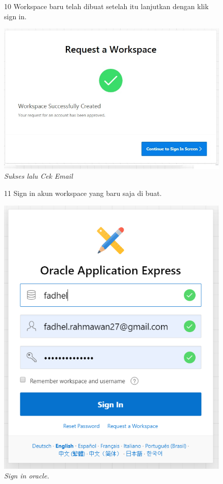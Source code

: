 \begin{enumerate}
\begin{figure}
\item[10] Workspace baru telah dibuat setelah itu lanjutkan dengan klik sign in.

    \begin{center}
\includegraphics[scale=0.5]{figures/pict(5).jpg}
    \caption{\textit{Sukses lalu Cek Email}}
        \end{center}
\label{gambar}
\end{figure}

\begin{figure}
\item[11] Sign in akun workspace yang baru saja di buat.

    \begin{center}
\includegraphics[scale=0.5]{figures/apex1.PNG}
    \caption{\textit{Sign in oracle.}}
        \end{center}
\label{gambar}
\end{figure}


\end{enumerate}
